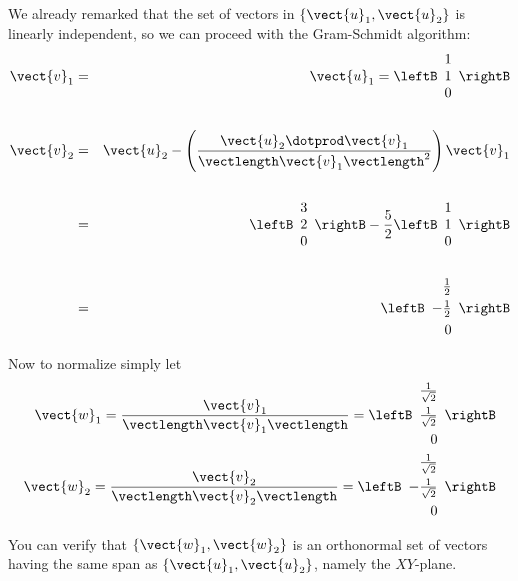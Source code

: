 \begin{solution}
We already remarked that the set of vectors in $\{\vect{u}_1,
\vect{u}_2\}$ is linearly independent, so we can proceed with the
Gram-Schmidt algorithm:
\begin{eqnarray*}
\vect{v}_1 &=& \vect{u}_1 =  \leftB 
\begin{array}{r}
1 \\
1 \\
0
\end{array}
\rightB \\
&& \\
\vect{v}_{2} &=& \vect{u}_{2} - \left(  \dfrac{\vect{u}_2 \dotprod \vect{v}_1}{\vectlength \vect{v}_1 \vectlength^2} \right)  \vect{v}_1\\ 
&& \\
&=& \leftB 
\begin{array}{r}
3 \\
2 \\
0
\end{array}
\rightB
- 
\frac{5}{2} 
 \leftB 
\begin{array}{r}
1 \\
1 \\
0
\end{array}
\rightB \\
&&\\
&=&  \leftB 
\begin{array}{r}
\vspace{0.05in}\frac{1}{2} \\
-\vspace{0.05in}\frac{1}{2} \\
0
\end{array}
\rightB 
\end{eqnarray*}

Now to normalize simply let 
\begin{eqnarray*}
\vect{w}_1  = \frac{\vect{v}_1}{\vectlength\vect{v}_1\vectlength}  = \leftB 
\begin{array}{r}
\vspace{0.05in}\frac{1}{\sqrt{2}}  \\
\vspace{0.05in}\frac{1}{\sqrt{2}} \\
0
\end{array}
\rightB \\
\vect{w}_2  = \frac{\vect{v}_2}{\vectlength\vect{v}_2\vectlength}  = \leftB 
\begin{array}{r}
\vspace{0.05in}\frac{1}{\sqrt{2}}  \\
-\vspace{0.05in}\frac{1}{\sqrt{2}} \\
 0
\end{array}
\rightB
\end{eqnarray*}

You can verify that $\{\vect{w}_1, \vect{w}_2\}$ is an orthonormal set of vectors  having the same span as
$\{\vect{u}_1, \vect{u}_2\}$,  namely the $XY$-plane.
\end{solution}

